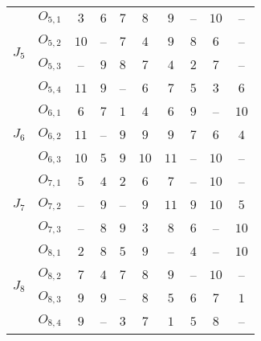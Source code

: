\begin{table}[htb]
\begin{tabular}{llcccccccc}
\multirow{4}{*}{$J_{5}$} & $O_{5,1}$ & $3$ & $6$ & $7$ & $8$ & $9$ & -- & $10$ & --\\
& $O_{5,2}$ & $10$ & -- & $7$ & $4$ & $9$ & $8$ & $6$ & --\\
& $O_{5,3}$ & -- & $9$ & $8$ & $7$ & $4$ & $2$ & $7$ & --\\
& $O_{5,4}$ & $11$ & $9$ & -- & $6$ & $7$ & $5$ & $3$ & $6$\\
\multirow{3}{*}{$J_{6}$} & $O_{6,1}$ & $6$ & $7$ & $1$ & $4$ & $6$ & $9$ & -- & $10$\\
& $O_{6,2}$ & $11$ & -- & $9$ & $9$ & $9$ & $7$ & $6$ & $4$\\
& $O_{6,3}$ & $10$ & $5$ & $9$ & $10$ & $11$ & -- & $10$ & --\\
\multirow{3}{*}{$J_{7}$} & $O_{7,1}$ & $5$ & $4$ & $2$ & $6$ & $7$ & -- & $10$ & --\\
& $O_{7,2}$ & -- & $9$ & -- & $9$ & $11$ & $9$ & $10$ & $5$\\
& $O_{7,3}$ & -- & $8$ & $9$ & $3$ & $8$ & $6$ & -- & $10$\\
\multirow{4}{*}{$J_{8}$} & $O_{8,1}$ & $2$ & $8$ & $5$ & $9$ & -- & $4$ & -- & $10$\\
& $O_{8,2}$ & $7$ & $4$ & $7$ & $8$ & $9$ & -- & $10$ & --\\
& $O_{8,3}$ & $9$ & $9$ & -- & $8$ & $5$ & $6$ & $7$ & $1$\\
& $O_{8,4}$ & $9$ & -- & $3$ & $7$ & $1$ & $5$ & $8$ & --\\
\hline
  \end{tabular}
\end{table}


